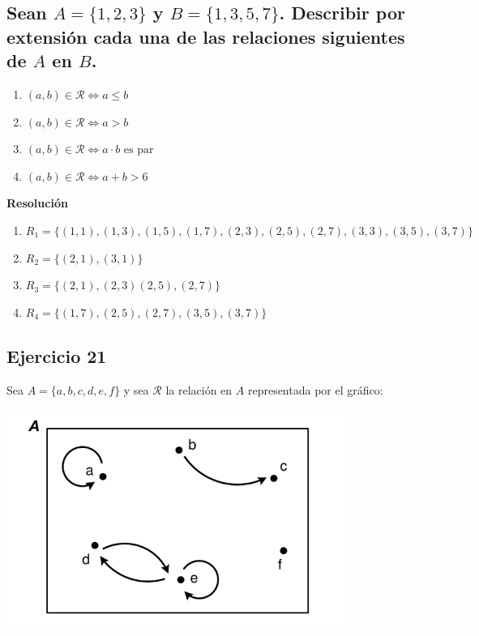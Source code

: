 \documentclass[11pt]{article}
\begin{document}
\subsection{Sean $A = \{1,2,3\}$ y $B = \{1,3,5,7\}$. Describir por extensión cada una de las relaciones siguientes de $A$ en $B$.}

\begin{enumerate}[label=\roman*)]
    \item $(a,b) \in \mathcal{R} \iff a \leq b$
    \item $(a,b) \in \mathcal{R} \iff a > b$
    \item $(a,b) \in \mathcal{R} \iff a \cdot b \text{ es par}$
    \item $(a,b) \in \mathcal{R} \iff a + b > 6$
\end{enumerate}

\textbf{Resolución}
\begin{enumerate}[label=\roman*)]
    \item $ R_{1} =  \{(1,1), (1, 3), (1, 5), (1, 7), (2, 3), (2, 5), (2, 7), (3, 3), (3, 5), (3, 7)\}$
    \item $ R_{2} = \{ (2,1 ), (3,1)\}$
    \item $ R_{3} = \{(2,1), (2,3) (2, 5), (2, 7)\}$
    \item $ R_{4} = \{(1, 7), (2,5), (2, 7), (3,5), (3,7)\} $
\end{enumerate}

\subsection*{Ejercicio 21}

Sea $A = \{a, b, c, d, e, f\}$ y sea $\mathcal{R}$ la relación en $A$ representada por el gráfico:

\begin{center}
    \includegraphics[scale=1]{ejercicio21.png}
\end{center}
\end{document}
